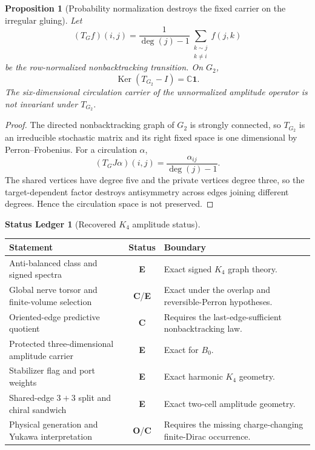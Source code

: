 \documentclass[11pt,oneside,openany]{book}
\numberwithin{equation}{chapter}
\newtheorem{proposition}[theorem]{Proposition}
\theoremstyle{definition}
\newtheorem{ledger}[theorem]{Status Ledger}
\theoremstyle{remark}
\newcommand{\C}{\mathbb C}
\newcommand{\one}{\mathbf 1}
\newcommand{\Ker}{\operatorname{Ker}}
\newcommand{\statusE}{\textcolor{ExactColor}{\textbf{E}}}
\newcommand{\statusC}{\textcolor{CondColor}{\textbf{C}}}
\newcommand{\statusO}{\textcolor{OpenColor}{\textbf{O}}}
\begin{document}
\begin{proposition}[Probability normalization destroys the fixed carrier on the irregular gluing]
\label{prop:row-normalization-collapse}
Let
\[
 (T_Gf)(i,j)
 =\frac1{\deg(j)-1}
 \sum_{\substack{k\sim j\\k\neq i}}f(j,k)
\]
be the row-normalized nonbacktracking transition.  On \(G_2\),
\[
 \boxed{\Ker(T_{G_2}-I)=\C\one.}
\]
The six-dimensional circulation carrier of the unnormalized amplitude
operator is not invariant under \(T_{G_2}\).
\end{proposition}

\begin{proof}
The directed nonbacktracking graph of \(G_2\) is strongly connected, so
\(T_{G_2}\) is an irreducible stochastic matrix and its right fixed space is
one dimensional by Perron--Frobenius.  For a circulation \(\alpha\),
\[
 (T_GJ\alpha)(i,j)
 =\frac{\alpha_{ij}}{\deg(j)-1}.
\]
The shared vertices have degree five and the private vertices degree three,
so the target-dependent factor destroys antisymmetry across edges joining
different degrees.  Hence the circulation space is not preserved.
\end{proof}

\begin{ledger}[Recovered \(K_4\) amplitude status]
\begin{center}
\begin{tabularx}{0.97\textwidth}{@{}p{}cX@{}}
\toprule
Statement & Status & Boundary\\
\midrule
Anti-balanced class and signed spectra & \statusE & Exact signed \(K_4\) graph theory.\\
Global nerve torsor and finite-volume selection & \statusC/\statusE & Exact under the overlap and reversible-Perron hypotheses.\\
Oriented-edge predictive quotient & \statusC & Requires the last-edge-sufficient nonbacktracking law.\\
Protected three-dimensional amplitude carrier & \statusE & Exact for \(B_0\).\\
Stabilizer flag and port weights & \statusE & Exact harmonic \(K_4\) geometry.\\
Shared-edge \(3+3\) split and chiral sandwich & \statusE & Exact two-cell amplitude geometry.\\
Physical generation and Yukawa interpretation & \statusO/\statusC & Requires the missing charge-changing finite-Dirac occurrence.\\
\bottomrule
\end{tabularx}
\end{center}
\end{ledger}
\end{document}
